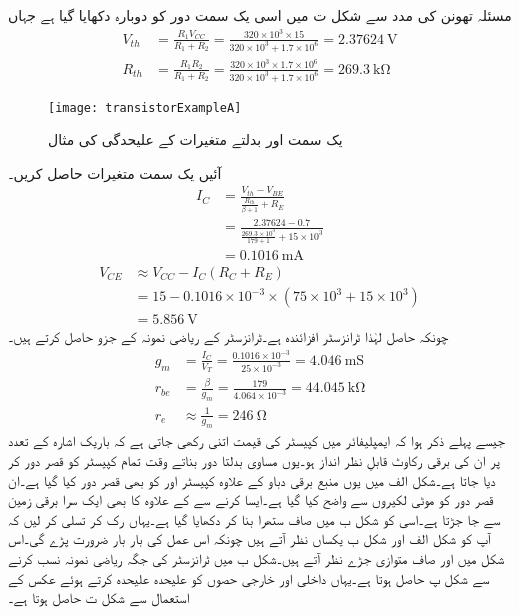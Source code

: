 مسئلہ تھونن کی مدد سے شکل  ت میں اسی یک سمت دور کو دوبارہ دکھایا گیا ہے جہاں
\begin{align*}
V_{th}&=\frac{R_1 V_{CC}}{R_1+R_2}=\frac{320 \times 10^{3} \times 15}{320\times 10^{3}+1.7 \times 10^{6}}=\SI{2.37624}{\volt}\\
R_{th}&=\frac{R_1 R_2}{R_1+R_2}=\frac{320 \times 10^{3} \times 1.7 \times 10^{6}}{320 \times 10^{3}+1.7 \times 10^{6}}=\SI{269.3}{\kilo \ohm}
\end{align*}
%
\begin{figure}
\centering
\texttt{[image: transistorExampleA]}
\caption{یک سمت اور بدلتے متغیرات کے علیحدگی کی مثال}
\label{شکل_مثال_کا_دور_الف}
\end{figure}
آئیں یک سمت متغیرات حاصل کریں۔
\begin{align*}
I_C&=\frac{V_{th}-V_{BE}}{\frac{R_{th}}{\beta+1}+R_E}\\
&=\frac{2.37624-0.7}{\frac{269.3 \times 10^{3}}{179+1}+15\times 10^{3}}\\
&=\SI{0.1016}{ \milli \ampere}
\end{align*}
%
\begin{align*}
V_{CE} &\approx V_{CC}-I_C \left(R_C+R_E \right )\\
&=15-0.1016 \times 10^{-3} \times \left(75 \times 10^{3}+15 \times 10^{3} \right )\\
&=\SI{5.856}{\volt}
\end{align*}
چونکہ حاصل   لہٰذا ٹرانزسٹر افزائندہ ہے۔ٹرانزسٹر کے   ریاضی نمونہ  کے جزو حاصل کرتے ہیں۔
\begin{align*}
g_m &=\frac{I_C}{V_T} =\frac{0.1016 \times 10^{-3}}{25 \times 10^{-3}}=\SI{4.046}{\milli \siemens}\\
r_{be}&=\frac{\beta}{g_m}=\frac{179}{4.064 \times 10^{-3}} =\SI{44.045}{\kilo \ohm}\\
r_e & \approx \frac{1}{g_m}=\SI{246}{\ohm}
\end{align*}
جیسے پہلے ذکر ہوا کہ ایمپلیفائر میں کپیسٹر کی قیمت اتنی رکھی جاتی ہے کہ باریک اشارہ کے تعدد پر ان کی برقی رکاوٹ  قابلِ نظر انداز ہو۔یوں مساوی بدلتا دور بناتے وقت تمام کپیسٹر کو قصر دور کر دیا جاتا ہے۔شکل  الف میں یوں منبع برقی دباو  کے علاوہ کپیسٹر   اور  کو بھی قصر دور کیا گیا ہے۔ان قصر دور کو موٹی لکیروں سے واضح کیا گیا ہے۔ایسا کرنے سے  کے علاوہ  کا بھی ایک سرا برقی زمین سے جا جڑتا ہے۔اسی کو شکل  ب میں صاف ستھرا بنا کر دکھایا گیا ہے۔یہاں رک کر تسلی کر لیں کہ آپ کو شکل  الف   اور شکل  ب یکساں نظر آتے ہیں چونکہ اس عمل کی بار بار ضرورت پڑے گی۔اس شکل میں   اور   صاف متوازی جڑے نظر آتے ہیں۔شکل  ب میں ٹرانزسٹر کی جگہ    ریاضی نمونہ  نسب کرنے سے شکل  پ حاصل ہوتا ہے۔یہاں داخلی اور خارجی حصوں کو علیحدہ علیحدہ کرتے ہوئے عکس  کے استعمال سے شکل  ت حاصل ہوتا ہے۔

